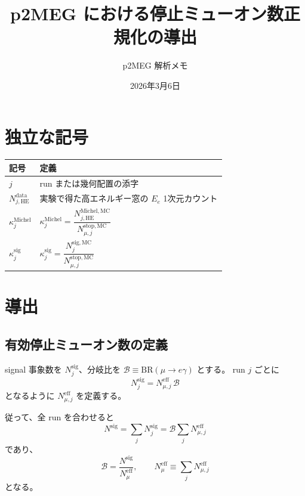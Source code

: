 \documentclass[a4paper,11pt]{jsarticle}
\title{p2MEG における停止ミューオン数正規化の導出}
\author{p2MEG 解析メモ}
\date{2026年3月6日}
\begin{document}
\maketitle

\section{独立な記号}
\begin{table}[h]
\centering
\begin{tabular}{ll}
\toprule
記号 & 定義 \\
\midrule
$j$ & run または幾何配置の添字 \\
$N_{j,\mathrm{HE}}^{\mathrm{data}}$ & 実験で得た高エネルギー窓の $E_e$ 1次元カウント \\
$\kappa_{j}^{\mathrm{Michel}}$ &
\(
\kappa_{j}^{\mathrm{Michel}}
=
\dfrac{N_{j,\mathrm{HE}}^{\mathrm{Michel,MC}}}{N_{\mu,j}^{\mathrm{stop,MC}}}
\) \\
$\kappa_{j}^{\mathrm{sig}}$ &
\(
\kappa_{j}^{\mathrm{sig}}
=
\dfrac{N_{j}^{\mathrm{sig,MC}}}{N_{\mu,j}^{\mathrm{stop,MC}}}
\) \\
\bottomrule
\end{tabular}
\end{table}

\section{導出}
\subsection{有効停止ミューオン数の定義}
signal 事象数を $N_{j}^{\mathrm{sig}}$、分岐比を $\mathcal{B}\equiv \mathrm{BR}(\mu\to e\gamma)$ とする。
run $j$ ごとに
\begin{equation}
N_{j}^{\mathrm{sig}}
=
N_{\mu,j}^{\mathrm{eff}}\,\mathcal{B}
\end{equation}
となるように $N_{\mu,j}^{\mathrm{eff}}$ を定義する。

従って、全 run を合わせると
\begin{equation}
N^{\mathrm{sig}}
=
\sum_j N_{j}^{\mathrm{sig}}
=
\mathcal{B}\sum_j N_{\mu,j}^{\mathrm{eff}}
\end{equation}
であり、
\begin{equation}
\mathcal{B}
=
\frac{N^{\mathrm{sig}}}{N_{\mu}^{\mathrm{eff}}},
\qquad
N_{\mu}^{\mathrm{eff}} \equiv \sum_j N_{\mu,j}^{\mathrm{eff}}
\label{eq:br_def}
\end{equation}
となる。
\end{document}
